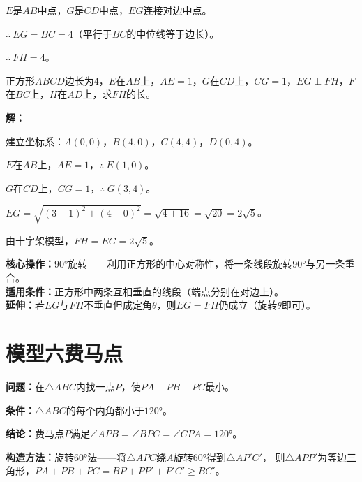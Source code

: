 \documentclass[12pt, a4paper]{ctexart}
\begin{document}
$E$是$AB$中点，$G$是$CD$中点，$EG$连接对边中点。

$\therefore\ EG = BC = 4$（平行于$BC$的中位线等于边长）。

$\therefore\ FH = \boxed{4}$。

\begin{examplebox}[【例题10】十字架模型综合]
正方形$ABCD$边长为$4$，$E$在$AB$上，$AE = 1$，$G$在$CD$上，$CG = 1$，$EG \perp FH$，$F$在$BC$上，$H$在$AD$上，求$FH$的长。
\end{examplebox}

\textbf{解：}

建立坐标系：$A(0,0)$，$B(4,0)$，$C(4,4)$，$D(0,4)$。

$E$在$AB$上，$AE=1$，$\therefore\ E(1,0)$。

$G$在$CD$上，$CG=1$，$\therefore\ G(3,4)$。

$EG = \sqrt{(3-1)^2 + (4-0)^2} = \sqrt{4+16} = \sqrt{20} = 2\sqrt{5}$。

由十字架模型，$FH = EG = \boxed{2\sqrt{5}}$。

\begin{tipbox}
\textbf{核心操作：}$90°$旋转——利用正方形的中心对称性，将一条线段旋转$90°$与另一条重合。\\
\textbf{适用条件：}正方形中两条互相垂直的线段（端点分别在对边上）。\\
\textbf{延伸：}若$EG$与$FH$不垂直但成定角$\theta$，则$EG = FH$仍成立（旋转$\theta$即可）。
\end{tipbox}

\newpage
\section*{\textcolor{modelteal}{模型六\quad 费马点}}

\begin{modelbox}
\textbf{问题：}在$\triangle ABC$内找一点$P$，使$PA + PB + PC$最小。

\textbf{条件：}$\triangle ABC$的每个内角都小于$120°$。

\textbf{结论：}费马点$P$满足$\angle APB = \angle BPC = \angle CPA = 120°$。

\textbf{构造方法：}旋转$60°$法——将$\triangle APC$绕$A$旋转$60°$得到$\triangle AP'C'$，
则$\triangle APP'$为等边三角形，$PA + PB + PC = BP + PP' + P'C' \geqslant BC'$。
\end{modelbox}
\end{document}
